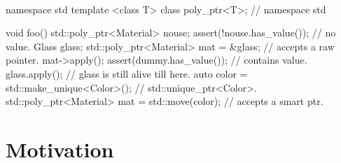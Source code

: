 \documentclass{article}
\begin{document}
\paragraph{}
\begin{codeblock}
namespace std {
template <class T>
class poly_ptr<T>;
} // namespace std

void foo() {
  {
    std::poly_ptr<Material> nouse;
    assert(!nouse.has_value()); // no value.
  }
  {
    Glass glass;
    {
      std::poly_ptr<Material> mat = &glass; // accepts a raw pointer.
      mat->apply();
      assert(dummy.has_value()); // contains value.
    }
    glass.apply(); // glass is still alive till here.
  }
  {
    auto color = std::make_unique<Color>(); // std::unique\_ptr\textless Color\textgreater.
    std::poly_ptr<Material> mat = std::move(color); // accepts a smart ptr.
  }
}
\end{codeblock}

\section{Motivation}
\end{document}

